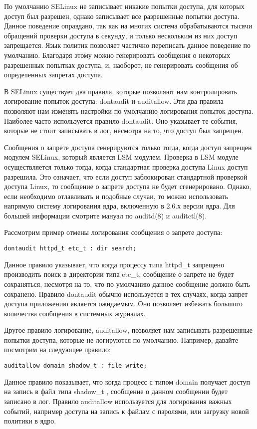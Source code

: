 \documentclass{./../class/UIR}
\begin{document}
    По умолчанию SELinux не записывает никакие попытки доступа, для которых
    доступ был разрешен, однако записывает все разрешенные попытки доступа.
    Данное поведение оправдано, так как на многих система обрабатываются тысячи
    обращений проверки доступа в секунду, и только нескольким из них доступ
    запрещается. Язык политик позволяет частично переписать данное поведение по
    умолчанию. Благодаря этому можно генерировать сообщения о некоторых
    разрешенных попытках доступа, и, наоборот, не генерировать сообщения об
    определенных запретах доступа.

    В SELinux существует два правила, которые позволяют нам контролировать
    логирование попыток доступа: dontaudit и auditallow. Эти два правила
    позволяют нам изменять настройки по умолчанию логирования попыток доступа.
    Наиболее часто используется правило dontaudit. Оно указывает те события,
    которые не стоит записывать в лог, несмотря на то, что доступ был запрещен.

    Сообщения о запрете доступа генерируются только тогда, когда доступ запрещен
    модулем SELinux, который является LSM модулем. Проверка в LSM модуле
    осуществляется только тогда, когда стандартная проверка доступа Linux доступ
    разрешила. Это означает, что если доступ заблокирован стандартной проверкой
    доступа Linux, то сообщение о запрете доступа не будет сгенерировано.
    Однако, если необходимо отлавливать и подобные случаи, то можно использовать
    напрямую систему логирования ядра, включенную в 2.6.х версии ядра. Для
    большей информации смотрите мануал по auditd(8) и auditctl(8).

    Рассмотрим пример отмены логирования сообщения о запрете доступа:
\begin{verbatim}
dontaudit httpd_t etc_t : dir search;
\end{verbatim}
    Данное правило указывает, что когда процессу типа httpd\_t запрещено
    производить поиск в директории типа etc\_t, сообщение о запрете не будет
    сохраняться, несмотря на то, что по умолчанию данное сообщение должно быть
    сохранено. Правило dontaudit обычно используется в тех случаях, когда запрет
    доступа приложению является ожидаемым. Оно позволяет избежать большого
    количества сообщения в системных журналах.

    Другое правило логирование, auditallow, позволяет нам записывать разрешенные
    попытки доступа, которые не логируются по умолчанию. Например, давайте
    посмотрим на следующее правило:
\begin{verbatim}
auditallow domain shadow_t : file write;
\end{verbatim}
    Данное правило показывает, что когда процесс с типом domain получает доступ
    на запись в файл типа shadow\_t , сообщение о данном сообщении будет
    записано в лог. Правило auditallow используется для логирования важных
    событий, например доступа на запись к файлам с паролями, или загрузку новой
    политики в ядро.
\end{document}
